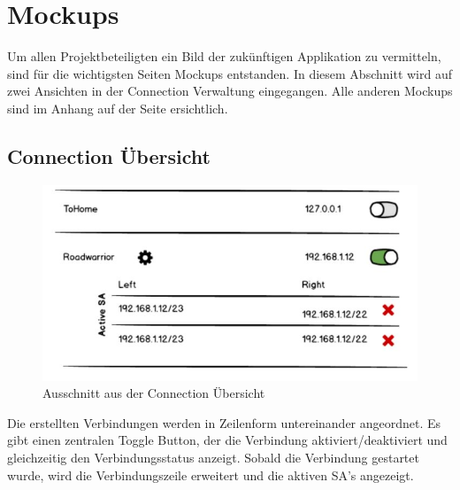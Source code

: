 \section{Mockups}
Um allen Projektbeteiligten ein Bild der zukünftigen Applikation zu vermitteln, sind für die wichtigsten Seiten Mockups entstanden. In diesem Abschnitt wird auf zwei Ansichten in der Connection Verwaltung eingegangen. Alle anderen Mockups sind im Anhang auf der Seite \pageref{Mockups} ersichtlich.

\subsection{Connection Übersicht}
\begin{figure}[H]
	\centering
	\includegraphics[width=330pt]{images/mockups/short_con_overview.jpg}
	\caption{Ausschnitt aus der Connection Übersicht}
\end{figure}

Die erstellten Verbindungen werden in Zeilenform untereinander angeordnet. Es gibt einen zentralen Toggle Button, der die Verbindung aktiviert/deaktiviert und gleichzeitig den Verbindungsstatus anzeigt. Sobald die Verbindung gestartet wurde, wird die Verbindungszeile erweitert und die aktiven SA's angezeigt.

